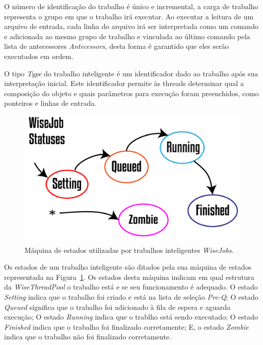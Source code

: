 \documentclass[a4paper,12pt]{monografia}
\theoremstyle{plain}
\theoremstyle{definition}
\theoremstyle{remark}
\begin{document}
O número de identificação do trabalho é único e incremental, a carga de trabalho representa o grupo em que o trabalho irá executar. Ao executar a leitura de um arquivo de entrada, cada linha do arquivo irá ser interpretada como um comando e adicionada ao mesmo grupo de trabalho e vinculada ao último comando pela lista de antecessores \textit{Antecessors}, desta forma é garantido que eles serão executados em ordem.

O tipo \textit{Type} do trabalho inteligente é um identificador dado ao trabalho após sua interpretação inicial. Este identificador permite às threads determinar qual a composição do objeto e quais parâmetros para execução foram preenchidos, como ponteiros e linhas de entrada. 

\begin{figure}[!htbp]
	\centering
	\includegraphics[width=\linewidth]{Figures/WiseJobStatus@16x.png}
	\caption{Máquina de estados utilizadas por trabalhos inteligentes \textit{WiseJobs}.}
	\label{fig9:wise_jobs}
\end{figure}

Os estados de um trabalho inteligente são ditados pela sua máquina de estados representada na Figura~\ref{fig9:wise_jobs}. Os estados desta máquina indicam em qual estrutura da \textit{WiseThreadPool} o trabalho está e se seu funcionamento é adequado. O estado \textit{Setting} indica que o trabalho foi criado e está na lista de seleção \textit{Pre-Q}; O estado \textit{Queued} significa que o trabalho foi adicionado à fila de espera e aguarda execução; O estado \textit{Running} indica que o trablho está sendo executado; O estado \textit{Finished} indica que o trabalho foi finalizado corretamente; E, o estado \textit{Zombie} indica que o trabalho não foi finalizado corretamente. 
\end{document}

